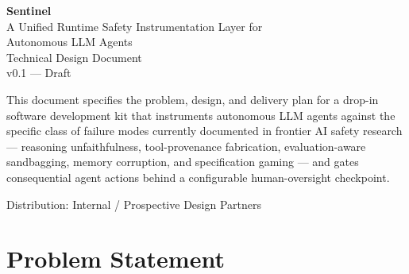 \documentclass[11pt,a4paper]{article}
\newcommand{\docversion}{v0.1 --- Draft}
\begin{document}
\begin{titlepage}
\centering
\vspace*{2.5cm}
{\Huge\bfseries\color{accent} Sentinel}\\[0.4cm]
{\Large A Unified Runtime Safety Instrumentation Layer for\\ Autonomous LLM Agents}\\[1.2cm]
{\large Technical Design Document}\\[0.3cm]
{\normalsize\color{gray} \docversion}\\[3cm]

\begin{minipage}{0.8\textwidth}
\centering
\normalsize
This document specifies the problem, design, and delivery plan for a drop-in software development kit that instruments autonomous LLM agents against the specific class of failure modes currently documented in frontier AI safety research --- reasoning unfaithfulness, tool-provenance fabrication, evaluation-aware sandbagging, memory corruption, and specification gaming --- and gates consequential agent actions behind a configurable human-oversight checkpoint.
\end{minipage}

\vfill
{\small\color{gray} Distribution: Internal / Prospective Design Partners}
\end{titlepage}

\tableofcontents
\newpage

\section{Problem Statement}
\end{document}
